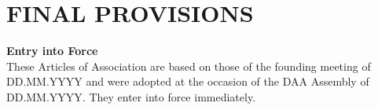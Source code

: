 \section{FINAL PROVISIONS}

\item \textbf{Entry into Force} \\
These Articles of Association are based on those of the founding meeting of DD.MM.YYYY and were adopted at the occasion of the DAA Assembly of DD.MM.YYYY.
They enter into force immediately.

